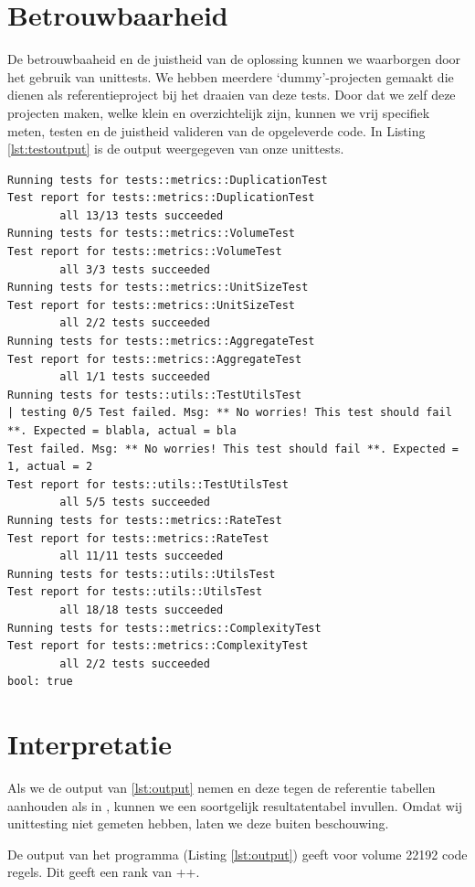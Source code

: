 \documentclass[a4paper]{article}
\begin{document}
\section{Betrouwbaarheid}
De betrouwbaaheid en de juistheid van de oplossing kunnen we waarborgen door het gebruik van unittests. 
We hebben meerdere `dummy'-projecten gemaakt die dienen als referentieproject bij het draaien van deze tests. 
Door dat we zelf deze projecten maken, welke klein en overzichtelijk zijn, kunnen we vrij specifiek meten, testen en de juistheid valideren van de opgeleverde code. In Listing \ref{lst:testoutput} is de output weergegeven van onze unittests.
\begin{lstlisting}[caption={Unit test output},label={lst:testoutput},frame = single]
Running tests for tests::metrics::DuplicationTest
Test report for tests::metrics::DuplicationTest
        all 13/13 tests succeeded
Running tests for tests::metrics::VolumeTest
Test report for tests::metrics::VolumeTest
        all 3/3 tests succeeded
Running tests for tests::metrics::UnitSizeTest
Test report for tests::metrics::UnitSizeTest
        all 2/2 tests succeeded
Running tests for tests::metrics::AggregateTest
Test report for tests::metrics::AggregateTest
        all 1/1 tests succeeded
Running tests for tests::utils::TestUtilsTest
| testing 0/5 Test failed. Msg: ** No worries! This test should fail **. Expected = blabla, actual = bla
Test failed. Msg: ** No worries! This test should fail **. Expected = 1, actual = 2
Test report for tests::utils::TestUtilsTest
        all 5/5 tests succeeded
Running tests for tests::metrics::RateTest
Test report for tests::metrics::RateTest
        all 11/11 tests succeeded
Running tests for tests::utils::UtilsTest
Test report for tests::utils::UtilsTest
        all 18/18 tests succeeded
Running tests for tests::metrics::ComplexityTest
Test report for tests::metrics::ComplexityTest
        all 2/2 tests succeeded
bool: true
\end{lstlisting}
\section{Interpretatie}
Als we de output van \ref{lst:output} nemen en deze tegen de referentie tabellen aanhouden als in \cite{A}, kunnen we een soortgelijk resultatentabel invullen. Omdat wij unittesting niet gemeten hebben, laten we deze buiten beschouwing.

De output van het programma (Listing \ref{lst:output}) geeft voor volume 22192 code regels. Dit geeft een rank van ++.
\end{document}
